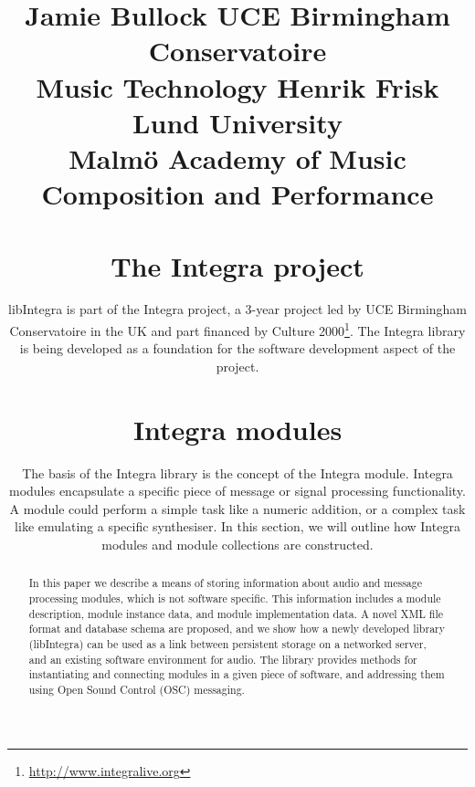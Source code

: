 
\title{

\twoauthors
  {Jamie Bullock} {UCE Birmingham Conservatoire \\ Music Technology}
  {Henrik Frisk} {Lund University\\
    Malm\"{o} Academy of Music\\ 
    Composition and Performance}


%
\maketitle
%
\begin{abstract}
In this paper we describe a means of storing information about audio and message processing modules, which is not software specific. This information includes a module description, module instance data, and module implementation data. A novel XML file format and database schema are proposed, and we show how a newly developed library (libIntegra) can be used as a link between persistent storage on a networked server, and an existing software environment for audio. The library provides methods for instantiating and connecting modules in a given piece of software, and addressing them using Open Sound Control (OSC) messaging. 
\end{abstract}

\section{The Integra project}\label{sec:integra_introduction}

libIntegra is part of the Integra project, a 3-year project led by UCE Birmingham Conservatoire in the UK and part financed by Culture 2000\footnote{\url{http://www.integralive.org}}. The Integra library is being developed as a foundation for the software development aspect of the project. 

\section{Integra modules}\label{sec:modules}

The basis of the Integra library is the concept of the Integra module. Integra modules encapsulate a specific piece of message or signal processing functionality. A module could perform a simple task like a numeric addition, or a complex task like emulating a specific synthesiser. In this section, we will outline how Integra modules and module collections are constructed.

}
